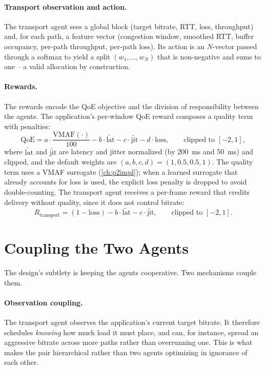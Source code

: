 \paragraph{Transport observation and action.} The transport agent sees a global block (target bitrate,
RTT, loss, throughput) and, for each path, a feature vector (congestion window, smoothed RTT, buffer
occupancy, per-path throughput, per-path loss). Its action is an $N$-vector passed through a softmax to
yield a split $(w_1,\dots,w_N)$ that is non-negative and sums to one -- a valid allocation by
construction.

\paragraph{Rewards.} The rewards encode the QoE objective and the division of responsibility between the
agents. The application's per-window QoE reward composes a quality term with penalties:
\begin{equation}
\mathrm{QoE} = a\cdot\frac{\mathrm{VMAF}(\cdot)}{100}
             - b\cdot\widetilde{\mathrm{lat}}
             - c\cdot\widetilde{\mathrm{jit}}
             - d\cdot\mathrm{loss},
\qquad \text{clipped to } [-2, 1],
\label{eq:p2qoe}
\end{equation}
where $\widetilde{\mathrm{lat}}$ and $\widetilde{\mathrm{jit}}$ are latency and jitter normalized (by
\SI{200}{\milli\second} and \SI{50}{\milli\second}) and clipped, and the default weights are
$(a,b,c,d) = (1, 0.5, 0.5, 1)$. The quality term uses a VMAF surrogate (\cref{ch:p2impl}); when a learned
surrogate that already accounts for loss is used, the explicit loss penalty is dropped to avoid
double-counting. The transport agent receives a per-frame reward that credits delivery without quality,
since it does not control bitrate:
\begin{equation}
R_{\text{transport}} = (1 - \mathrm{loss}) - b\cdot\widetilde{\mathrm{lat}} - c\cdot\widetilde{\mathrm{jit}},
\qquad \text{clipped to } [-2, 1].
\label{eq:p2transport}
\end{equation}

\section{Coupling the Two Agents}
\label{sec:p2design:coupling}

The design's subtlety is keeping the agents cooperative. Two mechanisms couple them.

\paragraph{Observation coupling.} The transport agent observes the application's current target bitrate.
It therefore schedules \emph{knowing} how much load it must place, and can, for instance, spread an
aggressive bitrate across more paths rather than overrunning one. This is what makes the pair hierarchical
rather than two agents optimizing in ignorance of each other.

